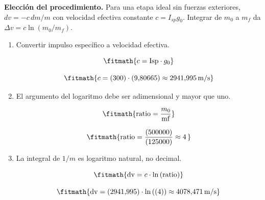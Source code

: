 \noindent\textbf{Elección del procedimiento.} Para una etapa ideal sin fuerzas exteriores, $dv=-c\,dm/m$ con velocidad efectiva constante $c=I_{sp}g_0$. Integrar de $m_0$ a $m_f$ da $\Delta v=c\ln(m_0/m_f)$.

\begin{enumerate}

\item Convertir impulso específico a velocidad efectiva.

\[\fitmath{c=\mathrm{Isp}\cdot g_{0}}\]

\[\fitmath{c=(300)\cdot (9{,}80665)\approx 2941{,}995\,\mathrm{m/s}}\]

\item El argumento del logaritmo debe ser adimensional y mayor que uno.

\[\fitmath{\mathrm{ratio}=\frac{m_{0}}{\mathrm{mf}}}\]

\[\fitmath{\mathrm{ratio}=\frac{(500000)}{(125000)}\approx 4\,}\]

\item La integral de $1/m$ es logaritmo natural, no decimal.

\[\fitmath{\mathrm{dv}=c\cdot \ln\left(\mathrm{ratio}\right)}\]

\[\fitmath{\mathrm{dv}=(2941{,}995)\cdot \ln\left((4)\right)\approx 4078{,}471\,\mathrm{m/s}}\]

\end{enumerate}
